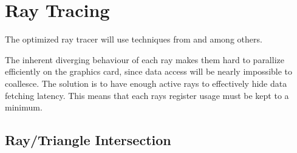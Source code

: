 \chapter{Ray Tracing}\label{chp:rayTracing}









The optimized ray tracer will use techniques from 
and  among others.


The inherent diverging behaviour of each ray makes them hard to
parallize efficiently on the graphics card, since data access will be
nearly impossible to coallesce. The solution is to have enough active
rays to effectively hide data fetching latency. This means that each
rays register usage must be kept to a minimum.


\section{Ray/Triangle Intersection}


